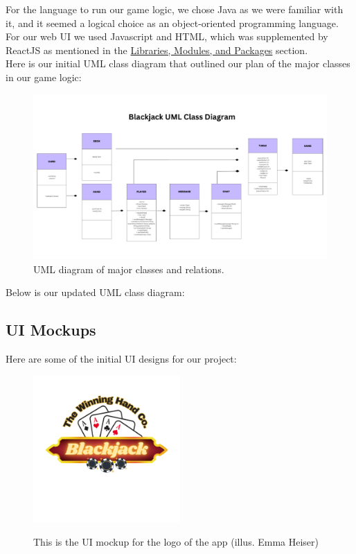 \noindent For the language to run our game logic, we chose Java as we were familiar with it, and it seemed a logical choice as an object-oriented programming language. For our web UI we used Javascript and HTML, which was supplemented by ReactJS as mentioned in the \hyperref[sec:libs/mods/packs]{Libraries, Modules, and Packages} section. \\

\noindent Here is our initial UML class diagram that outlined our plan of the major classes in our game logic: \\ 

\begin{figure}[hbt!]
    \centering
    \includegraphics[width=0.8\linewidth]{figures/UML Diagram Whiteboard.pdf}
    \caption{UML diagram of major classes and relations.}
    \label{fig:UML}
\end{figure}

\noindent Below is our updated UML class diagram:

\pagebreak

\subsection{UI Mockups}
Here are some of the initial UI designs for our project:

\begin{figure}[hbt!]
    \centering
    \includegraphics[width=0.5\textwidth]{figures/Blackjack.png} \\
    \caption{This is the UI mockup for the logo of the app (illus. Emma Heiser)}
    \label{fig:logo}
\end{figure}

